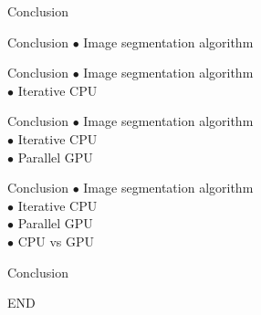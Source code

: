 \documentclass[10pt]{beamer}
\begin{document}
\begin{frame}{Conclusion}
\end{frame}

\begin{frame}{Conclusion}
$\bullet$ Image segmentation algorithm
\end{frame}

\begin{frame}{Conclusion}
$\bullet$ Image segmentation algorithm\\
$\bullet$ Iterative CPU
\end{frame}

\begin{frame}{Conclusion}
$\bullet$ Image segmentation algorithm\\
$\bullet$ Iterative CPU\\
$\bullet$ Parallel GPU
\end{frame}


\begin{frame}{Conclusion}
$\bullet$ Image segmentation algorithm\\
$\bullet$ Iterative CPU\\
$\bullet$ Parallel GPU\\
$\bullet$ CPU vs GPU
\end{frame}

\begin{frame}{Conclusion}
\begin{center}
    END
\end{center}
\end{frame}
\end{document}
